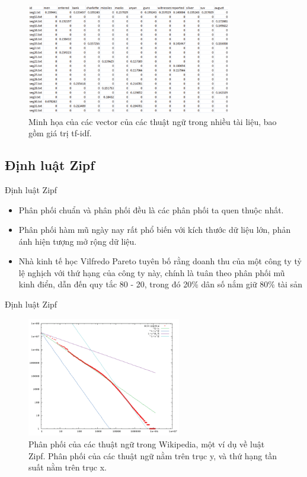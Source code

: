 \documentclass[10pt]{beamer}
\theoremstyle{remark}
\theoremstyle{definition}
\begin{document}
\begin{frame}
	\begin{figure}[h!]
        \centering
        \includegraphics[width=0.8\textwidth]{1.png}
        \caption{Minh họa của các vector của các thuật ngữ trong nhiều tài liệu, bao gồm giá trị tf-idf.}
        \label{fig:1}
    \end{figure}
\end{frame}

\subsection{Định luật Zipf}

\begin{frame}{Định luật Zipf}
	\begin{itemize}
		\item Phân phối chuẩn và phân phối đều là các phân phối ta quen thuộc nhất.
		\item Phân phối hàm mũ ngày nay rất phổ biến với kích thước dữ liệu lớn, phản ánh hiện tượng mở rộng dữ liệu.
		\item Nhà kinh tế học Vilfredo Pareto tuyên bố rằng doanh thu của một công ty tỷ lệ nghịch với thứ hạng của công ty này, chính là tuân theo phân phối mũ kinh điển,
		dẫn đến quy tắc 80 - 20, trong đó 20\% dân số nắm giữ 80\% tài sản
	\end{itemize}
	
\end{frame}

\begin{frame}{Định luật Zipf}
	\begin{figure}[h!]
        \centering
        \includegraphics[width=0.6\textwidth]{2.png}
        \caption{Phân phối của các thuật ngữ trong Wikipedia, một ví dụ về luật Zipf.
        Phân phối của các thuật ngữ nằm trên trục y, và thứ hạng tần suất nằm trên trục x.}
        \label{fig:2}
    \end{figure}

\end{frame}
\end{document}
